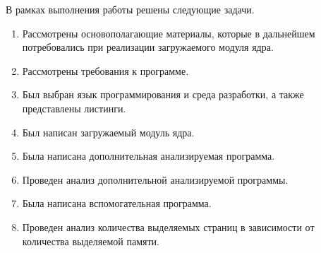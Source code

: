 \Conclusion %

В рамках выполнения работы решены следующие задачи.

\begin{enumerate}
	\item Рассмотрены основополагающие материалы, которые в дальнейшем потребовались при реализации загружаемого модуля ядра.
	\item Рассмотрены требования к программе.
	\item Был выбран язык программирования и среда разработки, а также представлены листинги.
	\item Был написан загружаемый модуль ядра.
	\item Была написана дополнительная анализируемая программа.
	\item Проведен анализ дополнительной анализируемой программы.
	\item Была написана вспомогательная программа.
	\item Проведен анализ количества выделяемых страниц в зависимости от количества выделяемой памяти.
\end{enumerate}
